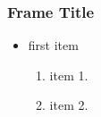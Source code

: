 \documentclass[hyperref={pdfpagemode=FullScreen},xcolor=table,t]{beamer}
\begin{document}
\begin{frame}
\frametitle{Frame Title}
\begin{itemize}
    \item<+-> first item
    \begin{enumerate}
        \item<+-> item 1.

        \item<+-> item 2.
    \end{enumerate}
\end{itemize}
\end{frame}
\end{document}

